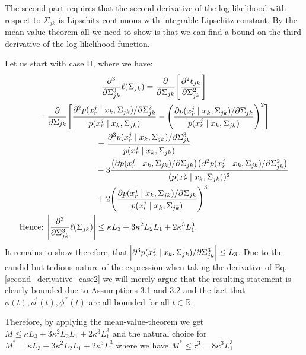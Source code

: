 \begin{condition}
    The second part requires that the second derivative of the log-likelihood with respect to $\Sigma_{jk}$ is Lipschitz continuous with integrable Lipschitz constant. By the mean-value-theorem all we need to show is that we can find a bound on the third derivative of the log-likelihood function.
    
    Let us start with case II, where we have:
    \begin{multline*}
            \frac{\partial^3}{\partial\Sigma_{jk}^3}\ell(\Sigma_{jk})
            = \frac{\partial}{\partial\Sigma_{jk}}\Bigg[\frac{\partial^2\ell_{jk}}{\partial \Sigma_{jk}^{2}}\Bigg] \\
            = \frac{\partial}{\partial\Sigma_{jk}}\Bigg[\frac{\partial^2 p(x^j_{r} \mid x_{k}, \Sigma_{jk})/\partial \Sigma_{jk}^{2}}{p(x^j_{r} \mid x_{k}, \Sigma_{jk})} - \Bigg(\frac{\partial p(x^j_{r} \mid x_{k}, \Sigma_{jk}) / \partial \Sigma_{jk}}{p(x^j_{r} \mid x_{k}, \Sigma_{jk})}\Bigg)^2\Bigg] \\
            \begin{aligned}
            &= \frac{\partial^3 p(x^j_{r} \mid x_{k}, \Sigma_{jk}) / \partial \Sigma_{jk}^3}{p(x^j_{r} \mid x_{k}, \Sigma_{jk})} \\
            &- 3\frac{\big(\partial p(x^j_{r} \mid x_{k}, \Sigma_{jk}) / \partial \Sigma_{jk}\big)\big( \partial^2 p(x^j_{r} \mid x_{k}, \Sigma_{jk}) / \partial \Sigma_{jk}^2\big)}{(p(x^j_{r} \mid x_{k}, \Sigma_{jk}))^2} \\
            &+ 2\Bigg(\frac{\partial p(x^j_{r} \mid x_{k}, \Sigma_{jk}) / \partial \Sigma_{jk}}{p(x^j_{r} \mid x_{k}, \Sigma_{jk})}\Bigg)^3 \\
            \text{Hence: } \abs{\frac{\partial^3}{\partial\Sigma_{jk}^3}\ell(\Sigma_{jk})} &\leq \kappa L_3 + 3\kappa^2L_2L_1 + 2 \kappa^3L_1^3.
            \end{aligned}
    \end{multline*}
    It remains to show therefore, that $\abs{\partial^3 p(x^j_{r} \mid x_{k}, \Sigma_{jk}) / \partial \Sigma_{jk}^3} \leq L_3$. Due to the candid but tedious nature of the expression when taking the derivative of Eq. \eqref{second_derivative_case2} we will merely argue that the resulting statement is clearly bounded due to Assumptions 3.1 and 3.2 
    and the fact that $\phi(t), \phi^\prime(t), \phi^{\prime\prime}(t)$ are all bounded for all $t \in \mathbb{R}$. 
    
    Therefore, by applying the mean-value-theorem we get $M \leq \kappa L_3 + 3\kappa^2L_2L_1 + 2 \kappa^3L_1^3$ and the natural choice for $M^* = \kappa L_3 + 3\kappa^2L_2L_1 + 2 \kappa^3L_1^3$ where we have $M^* \leq \tau^3 = 8\kappa^3L_1^3$   
    

\end{condition}
